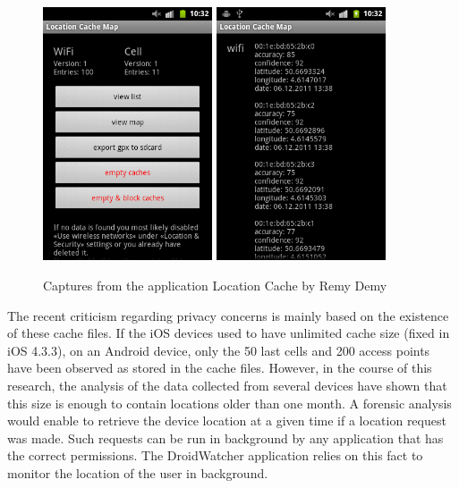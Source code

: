 \begin{figure}[h]
  \centering
  \includegraphics[width=5cm]{images/cache1.png}
  \includegraphics[width=5cm]{images/cache2.png}
  \caption{Captures from the application Location Cache by Remy Demy}
  \label{fig:locmap}
\end{figure}

The recent criticism regarding privacy concerns is mainly based on the existence of these cache files.
If the iOS devices used to have unlimited cache size (fixed in iOS 4.3.3), on an Android device, only the 50 last cells and 200 access points have been observed as stored in the cache files.
However, in the course of this research, the analysis of the data collected from several devices have shown that this size is enough to contain locations older than one month.
A forensic analysis would enable to retrieve the device location at a given time if a location request was made.
Such requests can be run in background by any application that has the correct permissions.
The DroidWatcher application relies on this fact to monitor the location of the user in background.\\

